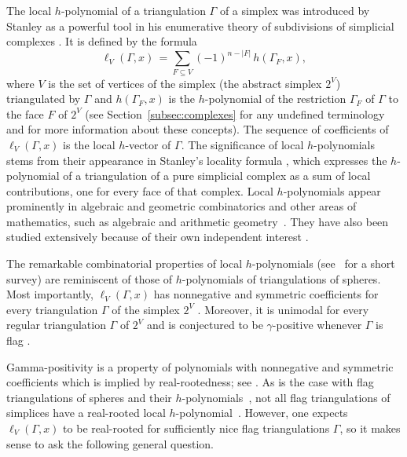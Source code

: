 \documentclass[11pt]{amsart}
\begin{document}
The local $h$-polynomial of a triangulation 
$\Gamma$ of a simplex was introduced by Stanley as 
a powerful tool in his enumerative theory of 
subdivisions of simplicial complexes \cite{Sta92}. 
It is defined by the formula  
%
\begin{equation} \label{eq:localh-def}
  \ell_V (\Gamma, x) \, = \sum_{F \subseteq V} 
  (-1)^{n - |F|} \, h(\Gamma_F, x),
\end{equation}
%
where $V$ is the set of vertices of the simplex (the
abstract simplex $2^V$) triangulated by 
$\Gamma$ and $h(\Gamma_F, x)$ is the $h$-polynomial
of the restriction $\Gamma_F$ of $\Gamma$ to the face
$F$ of $2^V$ (see Section~\ref{subsec:complexes} for 
any undefined terminology and for more information 
about these concepts). The sequence of coefficients 
of $\ell_V (\Gamma, x)$ is the local $h$-vector of 
$\Gamma$. The significance of local $h$-polynomials 
stems from their appearance in Stanley's locality 
formula \cite[Theorem~3.2]{Sta92}, which expresses the 
$h$-polynomial of a triangulation of a pure simplicial 
complex as a sum of local contributions, one for every 
face of that complex. Local $h$-polynomials appear 
prominently in algebraic and geometric combinatorics 
\cite{Ath12, Ath14, Ath22, Ath23+, GS20, KS16, Sta92} 
and other areas of mathematics, such as algebraic and 
arithmetic geometry~\cite{CMM18, KS16, LPS22+, Sta17}. 
They have also been studied extensively because of 
their own independent interest \cite{Ath16b, AS12, 
Cha94, MGPSS20, KMS19, LPS23, Zh19}.

The remarkable combinatorial properties of local 
$h$-polynomials (see~\cite{Ath16a} for a short 
survey) are reminiscent 
of those of $h$-polynomials of triangulations of 
spheres. Most importantly, $\ell_V(\Gamma, x)$ has 
nonnegative and symmetric coefficients for every 
triangulation $\Gamma$ of the simplex $2^V$ 
\cite{Sta92}. Moreover, it is unimodal for every 
regular triangulation $\Gamma$ of $2^V$ \cite{Sta92} 
and is conjectured to be $\gamma$-positive whenever
$\Gamma$ is flag \cite{Ath12}. 

Gamma-positivity is a property of polynomials with 
nonnegative and symmetric coefficients which is 
implied by real-rootedness; see 
\cite[Section~7.3]{Bra15}. As is the case with 
flag triangulations of spheres and their  
$h$-polynomials~\cite{Ga05}, not all flag 
triangulations of simplices have a real-rooted local 
$h$-polynomial~\cite{Ath16b}. However, one expects
$\ell_V (\Gamma, x)$ to be real-rooted for 
sufficiently nice flag triangulations $\Gamma$, so
it makes sense to ask the following general 
question.
\end{document}
